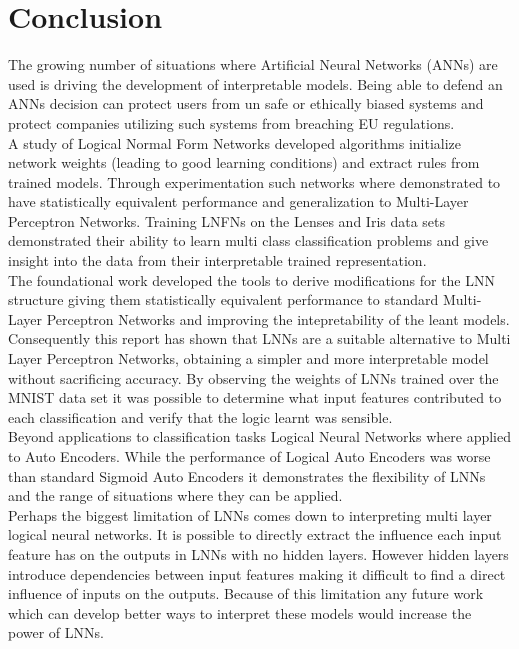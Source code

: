 \chapter{Conclusion}\label{C:con}
The growing number of situations where Artificial Neural Networks (ANNs) are used is driving the development of interpretable models. Being able to defend an ANNs decision can protect users from un safe or ethically biased systems and protect companies utilizing such systems from breaching EU regulations.\\

A study of Logical Normal Form Networks developed algorithms initialize network weights (leading to good learning conditions) and extract rules from trained models. Through experimentation such networks where demonstrated to have statistically equivalent performance and generalization to Multi-Layer Perceptron Networks. Training LNFNs on the Lenses and Iris data sets demonstrated their ability to learn multi class classification problems and give insight into the data from their interpretable trained representation.\\

The foundational work developed the tools to derive modifications for the LNN structure giving them statistically equivalent performance to standard Multi-Layer Perceptron Networks and improving the intepretability of the leant models. Consequently this report has shown that LNNs are a suitable alternative to Multi Layer Perceptron Networks, obtaining a simpler and more interpretable model without sacrificing accuracy. By observing the weights of LNNs trained over the MNIST data set it was possible to determine what input features contributed to each classification and verify that the logic learnt was sensible.\\

Beyond applications to classification tasks Logical Neural Networks where applied to Auto Encoders. While the performance of Logical Auto Encoders was worse than standard Sigmoid Auto Encoders it demonstrates the flexibility of LNNs and the range of situations where they can be applied.\\

Perhaps the biggest limitation of LNNs comes down to interpreting multi layer logical neural networks. It is possible to directly extract the influence each input feature has on the outputs in LNNs with no hidden layers. However hidden layers introduce dependencies between input features making it difficult to find a direct influence of inputs on the outputs. Because of this limitation any future work which can develop better ways to interpret these models would increase the power of LNNs.\\

